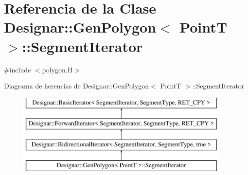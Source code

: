 \hypertarget{class_designar_1_1_gen_polygon_1_1_segment_iterator}{}\section{Referencia de la Clase Designar\+:\+:Gen\+Polygon$<$ PointT $>$\+:\+:Segment\+Iterator}
\label{class_designar_1_1_gen_polygon_1_1_segment_iterator}


{\ttfamily \#include $<$polygon.\+H$>$}

Diagrama de herencias de Designar\+:\+:Gen\+Polygon$<$ PointT $>$\+:\+:Segment\+Iterator\begin{figure}[H]
\begin{center}
\leavevmode
\includegraphics[height=4.000000cm]{class_designar_1_1_gen_polygon_1_1_segment_iterator}
\end{center}
\end{figure}
